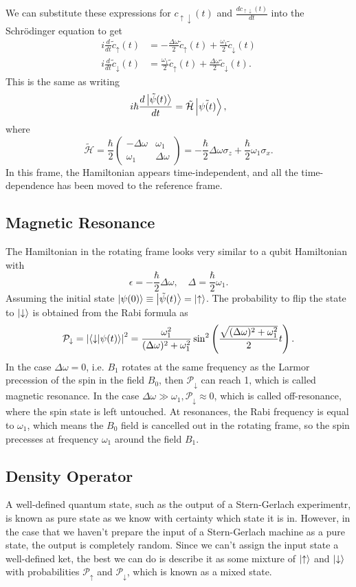 \documentclass{article}
\begin{document}
We can substitute these expressions for $c_{\uparrow\downarrow}(t)$ and $\frac{d c_{\uparrow\downarrow}(t)}{d t}$ into the Schr\"odinger equation to get
\begin{align*}
    i \frac{d }{d t}\tilde{c}_{\uparrow}(t) &= -\frac{\Delta \omega }{2}\tilde{c}_{\uparrow}(t)+\frac{\omega _1}{2}\tilde{c}_{\downarrow}(t) \\
    i \frac{d }{d t}\tilde{c}_{\downarrow}(t) &= \frac{\omega _1}{2}\tilde{c}_{\uparrow}(t)+\frac{\Delta \omega }{2}\tilde{c}_{\downarrow}(t).
\end{align*}
This is the same as writing
\[
    i \hbar \frac{d \ket{\tilde{\psi} (t)}}{d t}=\tilde{\mathcal{H}}\ket{\tilde{{\psi (t)}}},
\]
where
\[
    \tilde{\mathcal{H}}=\frac{\hbar}{2}\begin{pmatrix}
        -\Delta \omega & \omega _1 \\
        \omega _1 &\Delta \omega 
    \end{pmatrix}=-\frac{\hbar}{2}\Delta \omega \sigma _z+\frac{\hbar}{2}\omega _1\sigma _x.
\]
In this frame, the Hamiltonian appears time-independent, and all the time-dependence has been moved to the reference frame.

\subsection{Magnetic Resonance}
The Hamiltonian in the rotating frame looks very similar to a qubit Hamiltonian with
\[
    \epsilon =-\frac{\hbar}{2}\Delta \omega ,\quad\Delta =\frac{\hbar}{2}\omega _1.
\]
Assuming the initial state $\ket{\psi (0)}\equiv \ket{\tilde{\psi }(t)}=\ket{\uparrow}$. The probability to flip the state to $\ket{\downarrow}$ is obtained from the Rabi formula as
\[
    \mathcal{P}_{\downarrow}=\left| \braket{\downarrow}{\psi (t)} \right|^2=\frac{\omega _1^2}{(\Delta \omega )^2+\omega _1^2}\sin^2 \left( \frac{\sqrt{(\Delta \omega )^2+\omega _1^2}}{2}t \right).
\]
In the case $\Delta \omega =0$, i.e. $B_1$ rotates at the same frequency as the Larmor precession of the spin in the field $B_0$, then $\mathcal{P}_{\downarrow}$ can reach 1, which is called magnetic resonance. In the case $\Delta \omega \gg\omega _1,\mathcal{P}_{\downarrow}\approx 0$, which is called off-resonance, where the spin state is left untouched. At resonances, the Rabi frequency is equal to $\omega _1$, which means the $B_0$ field is cancelled out in the rotating frame, so the spin precesses at frequency $\omega _1$ around the field $B_1$.

\subsection{Density Operator}
A well-defined quantum state, such as the output of a Stern-Gerlach experimentr, is known as pure state as we know with certainty which state it is in. However, in the case that we haven't prepare the input of a Stern-Gerlach machine as a pure state, the output is completely random. Since we can't assign the input state a well-defined ket, the best we can do is describe it as some mixture of $\ket{\uparrow}$ and $\ket{\downarrow}$ with probabilities $\mathcal{P}_{\uparrow}$ and $\mathcal{P}_{\downarrow}$, which is known as a mixed state.
\end{document}
